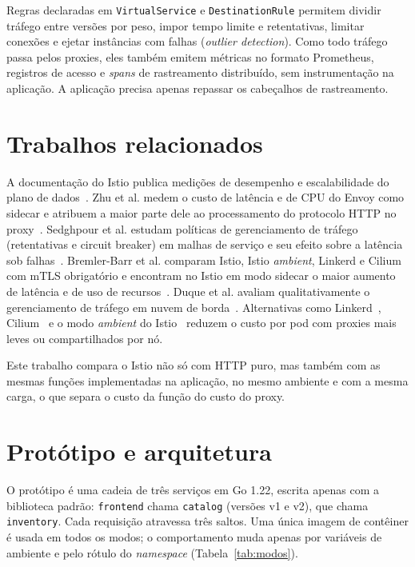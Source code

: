 \documentclass[12pt]{article}
\begin{document}
Regras declaradas em \texttt{VirtualService} e \texttt{DestinationRule}
permitem dividir tráfego entre versões por peso, impor tempo limite e
retentativas, limitar conexões e ejetar instâncias com falhas
(\emph{outlier detection}). Como todo tráfego passa pelos proxies, eles também
emitem métricas no formato Prometheus, registros de acesso e \emph{spans} de
rastreamento distribuído, sem instrumentação na aplicação. A aplicação precisa
apenas repassar os cabeçalhos de rastreamento.

\section{Trabalhos relacionados}

A documentação do Istio publica medições de desempenho e escalabilidade do
plano de dados~\cite{istio-perf}. Zhu et al. medem o custo de latência e de CPU
do Envoy como sidecar e atribuem a maior parte dele ao processamento do
protocolo HTTP no proxy~\cite{zhu2023}. Sedghpour et al. estudam políticas de
gerenciamento de tráfego (retentativas e circuit breaker) em malhas de serviço
e seu efeito sobre a latência sob falhas~\cite{sedghpour2022}. Bremler-Barr et
al. comparam Istio, Istio \emph{ambient}, Linkerd e Cilium com mTLS
obrigatório e encontram no Istio em modo sidecar o maior aumento de latência e
de uso de recursos~\cite{barr2025}. Duque et al. avaliam qualitativamente o
gerenciamento de tráfego em nuvem de borda~\cite{duque2022}. Alternativas como
Linkerd~\cite{linkerd}, Cilium~\cite{cilium} e o modo \emph{ambient} do
Istio~\cite{istio-ambient} reduzem o custo por pod com proxies mais leves ou
compartilhados por nó.

Este trabalho compara o Istio não só com HTTP puro, mas também com as mesmas
funções implementadas na aplicação, no mesmo ambiente e com a mesma carga, o
que separa o custo da função do custo do proxy.

\section{Protótipo e arquitetura}

O protótipo é uma cadeia de três serviços em Go 1.22, escrita apenas com a
biblioteca padrão: \texttt{frontend} chama \texttt{catalog} (versões v1 e v2),
que chama \texttt{inventory}. Cada requisição atravessa três saltos. Uma única
imagem de contêiner é usada em todos os modos; o comportamento muda apenas por
variáveis de ambiente e pelo rótulo do \emph{namespace}
(Tabela~\ref{tab:modos}).
\end{document}
